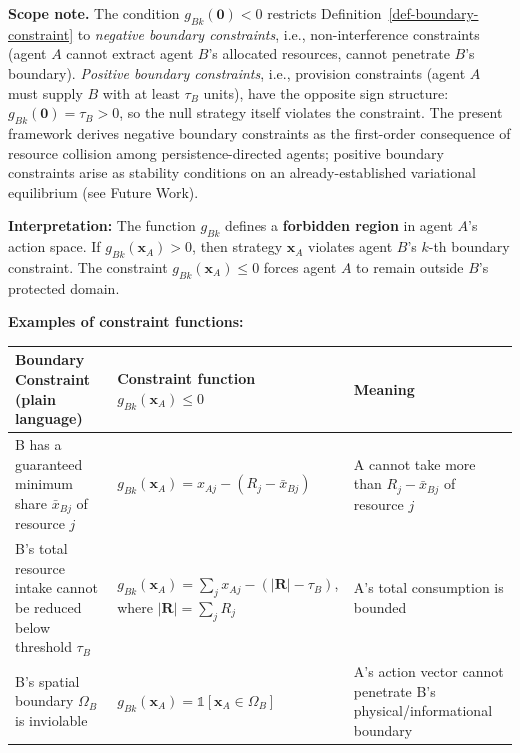 \documentclass[11pt]{article}
\theoremstyle{plain}
\theoremstyle{definition}
\theoremstyle{remark}
\newcounter{none}
\begin{document}
\textbf{Scope note.} The condition \(g_{Bk}(\mathbf{0}) < 0\) restricts
Definition~\ref{def-boundary-constraint} to \emph{negative boundary
constraints}, i.e., non-interference constraints (agent \(A\) cannot
extract agent \(B\)'s allocated resources, cannot penetrate \(B\)'s
boundary). \emph{Positive boundary constraints}, i.e., provision
constraints (agent \(A\) must supply \(B\) with at least \(\tau_B\)
units), have the opposite sign structure:
\(g_{Bk}(\mathbf{0}) = \tau_B > 0\), so the null strategy itself
violates the constraint. The present framework derives negative boundary
constraints as the first-order consequence of resource collision among
persistence-directed agents; positive boundary constraints arise as
stability conditions on an already-established variational equilibrium
(see Future Work).

\textbf{Interpretation:} The function \(g_{Bk}\) defines a
\textbf{forbidden region} in agent \(A\)'s action space. If
\(g_{Bk}(\mathbf{x}_A) > 0\), then strategy \(\mathbf{x}_A\) violates
agent \(B\)'s \(k\)-th boundary constraint. The constraint
\(g_{Bk}(\mathbf{x}_A) \leq 0\) forces agent \(A\) to remain outside
\(B\)'s protected domain.

\textbf{Examples of constraint functions:}

{\def\LTcaptype{none} %
\begin{longtable}[]{@{}
  >{\raggedright\arraybackslash}p{}
  >{\raggedright\arraybackslash}p{}
  >{\raggedright\arraybackslash}p{}@{}}
\toprule\noalign{}
\begin{minipage}[b]{\linewidth}\raggedright
Boundary Constraint (plain language)
\end{minipage} & \begin{minipage}[b]{\linewidth}\raggedright
Constraint function \(g_{Bk}(\mathbf{x}_A) \leq 0\)
\end{minipage} & \begin{minipage}[b]{\linewidth}\raggedright
Meaning
\end{minipage} \\
\midrule\noalign{}
\endhead
\bottomrule\noalign{}
\endlastfoot
B has a guaranteed minimum share \(\bar{x}_{Bj}\) of resource \(j\) &
\(g_{Bk}(\mathbf{x}_A) = x_{Aj} - (R_j - \bar{x}_{Bj})\) & A cannot take
more than \(R_j - \bar{x}_{Bj}\) of resource \(j\) \\
B's total resource intake cannot be reduced below threshold \(\tau_B\) &
\(g_{Bk}(\mathbf{x}_A) = \sum_j x_{Aj} - (|\mathbf{R}| - \tau_B)\),
where \(|\mathbf{R}| = \sum_j R_j\) & A's total consumption is
bounded \\
B's spatial boundary \(\Omega_B\) is inviolable &
\(g_{Bk}(\mathbf{x}_A) = \mathds{1}[\mathbf{x}_A \in \Omega_B]\) & A's
action vector cannot penetrate B's physical/informational boundary \\
\end{longtable}
}
\end{document}
